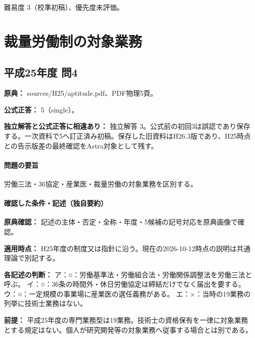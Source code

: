 \par 難易度 3（校準初稿）、優先度未評価。

\section{裁量労働制の対象業務}

\subsection{平成25年度 問4}
\label{q:h25-reg-apt-04}

\noindent\textbf{原典：} sources/H25/aptitude.pdf、PDF物理5頁。

\textbf{公式正答：} 5（single）。

\par\textbf{独立解答と公式正答に相違あり：} 独立解答 3。公式前の初回3は誤認であり保存する。一次資料で5へ訂正済み初稿。保存した旧資料はH26.3版であり、H25時点との告示版差の最終確認をAstra対象として残す。

\paragraph{問題の要旨} 労働三法・36協定・産業医・裁量労働の対象業務を区別する。

\paragraph{確認した条件・記述（独自要約）}\mbox{}\par

\noindent\textbf{原典確認：} 記述の主体・否定・全称・年度・5候補の記号対応を原典画像で確認。\par

\noindent\textbf{適用時点：} H25年度の制度又は指針に沿う。現在の2026-10-12時点の説明は共通理論で別記する。\par

\noindent\textbf{各記述の判断：} ア：○：労働基準法・労働組合法・労働関係調整法を労働三法と呼ぶ。 イ：○：36条の時間外・休日労働協定は締結だけでなく届出を要する。 ウ：○：一定規模の事業場に産業医の選任義務がある。 エ：×：当時の19業務の列挙に技術士業務はない。\par

\noindent\textbf{前提：} 平成25年度の専門業務型は19業務。技術士の資格保有を一律に対象業務とする規定はない。個人が研究開発等の対象業務へ従事する場合とは別である。\par

